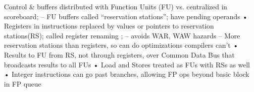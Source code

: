 Control & buffers distributed with Function Units (FU) vs.
centralized in scoreboard;
– FU buffers called “reservation stations”;
    have pending operands
• Registers in instructions replaced by values or pointers
to reservation stations(RS); called register renaming ;
– avoids WAR, WAW hazards
– More reservation stations than registers, so can do optimizations
compilers can’t
• Results to FU from RS, not through registers, over
Common Data Bus that broadcasts results to all FUs
• Load and Stores treated as FUs with RSs as well
• Integer instructions can go past branches, allowing
FP ops beyond basic block in FP queue


